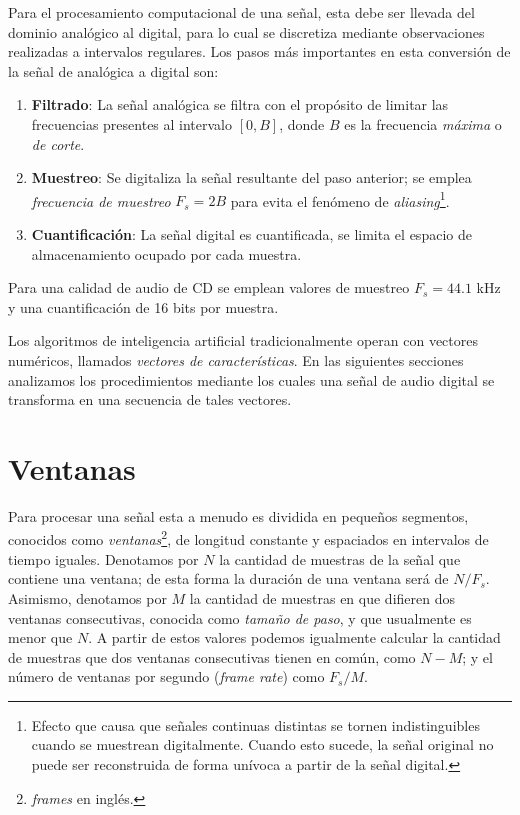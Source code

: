 Para el procesamiento computacional de una señal, esta debe ser llevada del dominio analógico al digital, para lo cual se discretiza mediante observaciones realizadas a intervalos regulares.
Los pasos más importantes en esta conversión de la señal de analógica a digital son:

\begin{enumerate}
    \item \textbf{Filtrado}: La señal analógica se filtra con el propósito de limitar las frecuencias presentes al intervalo $[0,B]$, donde $B$ es la frecuencia \textit{máxima} o \textit{de corte}.
    \item \textbf{Muestreo}: Se digitaliza la señal resultante del paso anterior;
    se emplea \textit{frecuencia de muestreo} $F_s = 2B$ para evita el fenómeno de \textit{aliasing}\footnote{Efecto que causa que señales continuas distintas se tornen indistinguibles cuando se muestrean digitalmente.
    Cuando esto sucede, la señal original no puede ser reconstruida de forma unívoca a partir de la señal digital.}.
    \item \textbf{Cuantificación}: La señal digital es cuantificada, se limita el espacio de almacenamiento ocupado por cada muestra.
\end{enumerate}

Para una calidad de audio de CD se emplean valores de muestreo $F_s = 44.1$ kHz y una cuantificación de 16 bits por muestra.

Los algoritmos de inteligencia artificial tradicionalmente operan con vectores numéricos, llamados \textit{vectores de características}.
En las siguientes secciones analizamos los procedimientos mediante los cuales una señal de audio digital se transforma en una secuencia de tales vectores.

\section{Ventanas}\label{sec:frames}

Para procesar una señal esta a menudo es dividida en pequeños segmentos, conocidos como \textit{ventanas}\footnote{\textit{frames} en inglés.}, de longitud constante y espaciados en intervalos de tiempo iguales.
Denotamos por $N$ la cantidad de muestras de la señal que contiene una ventana;
de esta forma la duración de una ventana será de $N/F_s$.
Asimismo, denotamos por $M$ la cantidad de muestras en que difieren dos ventanas consecutivas, conocida como \textit{tamaño de paso}, y que usualmente es menor que $N$.
A partir de estos valores podemos igualmente calcular la cantidad de muestras que dos ventanas consecutivas tienen en común, como $N-M$;
y el número de ventanas por segundo (\textit{frame rate}) como $F_s/M$.

